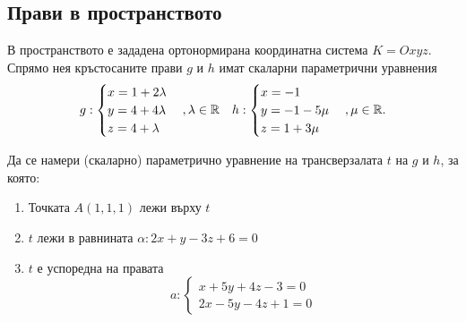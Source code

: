 \documentclass[numbers=endperiod, DIV=15]{scrartcl}
\begin{document}
\subsection{Прави в пространството}

\begin{exercise}
  В пространството е зададена ортонормирана координатна система $K = Oxyz$. Спрямо нея кръстосаните прави $g$ и $h$ имат скаларни параметрични уравнения
  \begin{align*}
    g: \begin{cases}
      x = 1 + 2\lambda \\
      y = 4 + 4\lambda \\
      z = 4 + \lambda
    \end{cases},
    \lambda \in \mathbb{R}
    &&
    h: \begin{cases}
      x = -1 \\
      y = -1 - 5\mu \\
      z = 1 + 3\mu
    \end{cases},
    \mu \in \mathbb{R}.
  \end{align*}

  Да се намери (скаларно) параметрично уравнение на трансверзалата $t$ на $g$ и $h$, за която:
  \begin{enumerate}[label=\alph*)]
    \item Точката $A(1, 1, 1)$ лежи върху $t$
    \item $t$ лежи в равнината $\alpha: 2x + y - 3z + 6 = 0$
    \item $t$ е успоредна на правата
    \begin{displaymath}
      a: \begin{cases}
        x + 5y + 4z - 3 = 0 \\
        2x - 5y - 4z + 1 = 0
      \end{cases}
    \end{displaymath}
  \end{enumerate}
\end{exercise}
\end{document}
